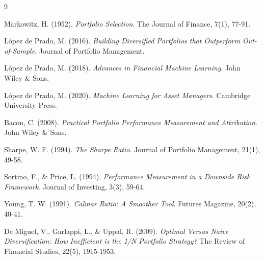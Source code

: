\documentclass[english]{maciarticle}
\begin{document}
\begin{thebibliography}{9}

Markowitz, H. (1952). \textit{Portfolio Selection}. The Journal of Finance, 7(1), 77-91.

López de Prado, M. (2016). \textit{Building Diversified Portfolios that Outperform Out-of-Sample}. Journal of Portfolio Management.

López de Prado, M. (2018). \textit{Advances in Financial Machine Learning}. John Wiley \& Sons.

López de Prado, M. (2020). \textit{Machine Learning for Asset Managers}. Cambridge University Press.

Bacon, C. (2008). \textit{Practical Portfolio Performance Measurement and Attribution}. John Wiley \& Sons.

Sharpe, W. F. (1994). \textit{The Sharpe Ratio}. Journal of Portfolio Management, 21(1), 49-58.

Sortino, F., \& Price, L. (1994). \textit{Performance Measurement in a Downside Risk Framework}. Journal of Investing, 3(3), 59-64.

Young, T. W. (1991). \textit{Calmar Ratio: A Smoother Tool}. Futures Magazine, 20(2), 40-41.

De Miguel, V., Garlappi, L., \& Uppal, R. (2009). \textit{Optimal Versus Naive Diversification: How Inefficient is the 1/N Portfolio Strategy?} The Review of Financial Studies, 22(5), 1915-1953.

\end{thebibliography}
\end{document}
